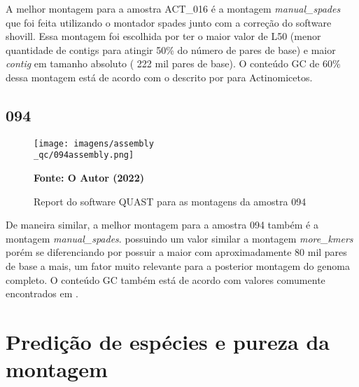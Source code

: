 A melhor montagem para a amostra ACT\_016 é a montagem \textit{manual_spades} que foi feita utilizando
o montador spades junto com a correção do software shovill. Essa montagem foi escolhida por ter o maior
valor de L50 (menor quantidade de contigs para atingir 50\% do número de pares de base) e maior 
\textit{contig} em tamanho absoluto ( 222 mil pares de base). O conteúdo GC de 60\% dessa montagem está de acordo
com o descrito por  para Actinomicetos.

\subsection{094}

\begin{figure}[H]
	\caption{Report do software QUAST para as montagens da amostra 094}
	\label{fig:quast_16}
	\centering
		\texttt{[image: imagens/assembly\\\_qc/094assembly.png]}
    \begin{small}\textbf{Fonte: O Autor (2022)}\end{small}
\end{figure}
\vspace{\floatsep}

De maneira similar, a melhor montagem para a amostra 094 também é a montagem \textit{manual_spades}.
possuindo um valor similar a montagem \textit{more_kmers} porém se diferenciando por possuir a maior 
com aproximadamente 80 mil pares de base a mais, um fator muito relevante para a posterior montagem do genoma completo.
O conteúdo GC também está de acordo com valores comumente encontrados em  \cite{nakamura1991bacillus}.

\section{Predição de espécies e pureza da montagem}

